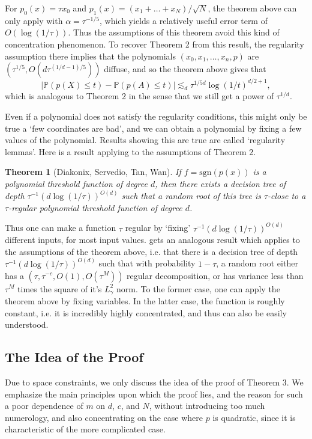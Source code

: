 \documentclass[12pt]{article}
\newtheorem{theorem}{Theorem}
\begin{document}
For $p_0(x) = \tau x_0$ and $p_1(x) = (x_1 + \dots + x_N) / \sqrt{N}$, the theorem above can only apply with $\alpha = \tau^{-1/5}$, which yields a relatively useful error term of $O(\log(1/\tau))$. Thus the assumptions of this theorem avoid this kind of concentration phenomenon. To recover Theorem 2 from this result, the regularity assumption there implies that the polynomials $(x_0,x_1,\dots,x_n,p)$ are $(\tau^{1/5},O(d \tau^{(1/d-1)/5}))$ diffuse, and so the theorem above gives that
%
\[ |\mathbb{P}(p(X) \leq t) - \mathbb{P}(p(A) \leq t)| \lesssim_d \tau^{1/5d} \log(1/t)^{d/2+1}, \]
%
which is analogous to Theorem 2 in the sense that we still get a power of $\tau^{1/d}$.

Even if a polynomial does not satisfy the regularity conditions, this might only be true a `few coordinates are bad', and we can obtain a polynomial by fixing a few values of the polynomial. Results showing this are true are called `regularity lemmas'. Here is a result applying to the assumptions of Theorem 2.

\begin{theorem} [Diakonix, Servedio, Tan, Wan] If $f = \text{sgn}(p(x))$ is a polynomial threshold function of degree $d$, then there exists a decision tree of depth $\tau^{-1} (d \log(1/\tau))^{O(d)}$ such that a random root of this tree is $\tau$-close to a $\tau$-regular polynomial threshold function of degree $d$.
\end{theorem}

Thus one can make a function $\tau$ regular by `fixing' $\tau^{-1} (d \log(1/\tau))^{O(d)}$ different inputs, for most input values. \cite{Kane} gets an analogous result which applies to the assumptions of the theorem above, i.e. that there is a decision tree of depth $\tau^{-1} (d \log (1/\tau))^{O(d)}$ such that with probability $1 - \tau$, a random root either has a $(\tau,\tau^{-c},O(1),O(\tau^M))$ regular decomposition, or has variance less than $\tau^M$ times the square of it's $L^2_\gamma$ norm. To the former case, one can apply the theorem above by fixing variables. In the latter case, the function is roughly constant, i.e. it is incredibly highly concentrated, and thus can also be easily understood.

\subsection{The Idea of the Proof}

Due to space constraints, we only discuss the idea of the proof of Theorem 3. We emphasize the main principles upon which the proof lies, and the reason for such a poor dependence of $m$ on $d$, $c$, and $N$, without introducing too much numerology, and also concentrating on the case where $p$ is quadratic, since it is characteristic of the more complicated case.
\end{document}
